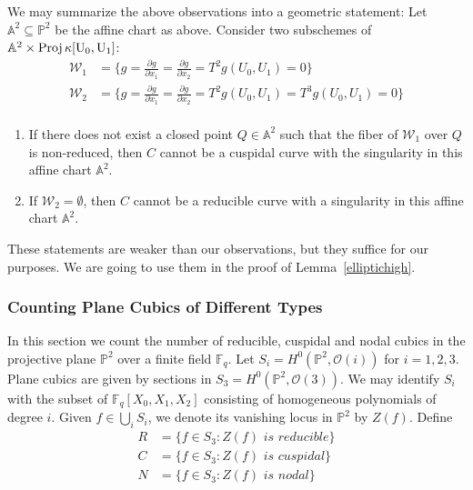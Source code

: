 \documentclass[12pt]{article}
\theoremstyle{plain}
\theoremstyle{definition}
\newcommand{\IA}{\mathbb{A}}
\newcommand{\IF}{\mathbb{F}}
\newcommand{\IP}{\mathbb{P}}
\newcommand{\sO}{\mathcal{O}}
\newcommand{\Proj}{\rm Proj\,}
\newcommand\union{\bigcup}
\newcommand{\<}{\langle}
\renewcommand{\>}{\rangle}
\newcommand{\p}{\partial}
\newcommand{\sW}{\mathcal{W}}
\begin{document}
We may summarize the above observations into a geometric statement: Let $\IA^2 \subseteq \IP^2$ be the affine chart as above. Consider two subschemes of $\IA^2 \times \Proj \kappa[U_0, U_1]$: 
\begin{align*}
\sW_1 &= \{ g = \frac{\p g}{\p x_1} = \frac{\p g}{\p x_2} = T^2 g(U_0, U_1) = 0 \} \\
\sW_2 &= \{ g = \frac{\p g}{\p x_1} = \frac{\p g}{\p x_2} = T^2 g(U_0, U_1) = T^3 g(U_0, U_1) = 0 \} \\
\end{align*} 
\begin{enumerate}
\item If there does not exist a closed point $Q \in \IA^2$ such that the fiber of $\sW_1$ over $Q$ is non-reduced, then $C$ cannot be a cuspidal curve with the singularity in this affine chart $\IA^2$. 
\item If $\sW_2 = \emptyset$, then $C$ cannot be a reducible curve with a singularity in this affine chart $\IA^2$. 
\end{enumerate}
These statements are weaker than our observations, but they suffice for our purposes. We are going to use them in the proof of Lemma~\ref{elliptichigh}. 


\subsubsection{Counting Plane Cubics of Different Types}
In this section we count the number of reducible, cuspidal and nodal cubics in the projective plane $\IP^2$ over a finite field $\IF_q$. Let $S_i = H^0(\IP^2, \sO(i))$ for $i = 1,2,3$. Plane cubics are given by sections in $S_3 = H^0(\IP^2, \sO(3))$. We may identify $S_i$ with the subset of $\IF_q[X_0, X_1, X_2]$ consisting of homogeneous polynomials of degree $i$. Given $f \in \union_i S_i$, we denote its vanishing locus in $\IP^2$ by $Z(f)$. Define 
\begin{align*}
R &= \{ f \in S_3 : Z(f) \textit{ is reducible} \} \\
C &= \{ f \in S_3 : Z(f) \textit{ is cuspidal} \} \\
N &= \{ f \in S_3 : Z(f) \textit{ is nodal} \}
\end{align*}
\end{document}

